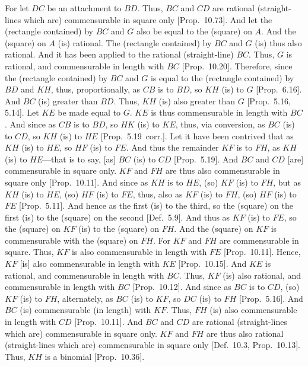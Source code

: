 For let $DC$ be an attachment to $BD$. Thus, $BC$ and $CD$
are rational (straight-lines which are) commensurable in square only [Prop.~10.73]. And let the (rectangle contained)
by $BC$ and $G$ also be equal to the (square) on $A$. And the (square)
on $A$ (is) rational. The (rectangle contained) by $BC$ and $G$ (is) thus also rational. And it has been applied to the rational (straight-line) $BC$.
Thus, $G$ is rational, and commensurable in length with $BC$ [Prop.~10.20]. Therefore, since the (rectangle contained) by $BC$ and $G$ is equal to the (rectangle contained) by
$BD$ and $KH$, thus, proportionally, as $CB$ is to $BD$, so $KH$ (is) to
$G$ [Prop.~6.16]. And $BC$ (is) greater than $BD$.
Thus, $KH$ (is) also greater than $G$ [Prop.~5.16,
5.14]. Let $KE$ be made equal to $G$.
$KE$ is thus commensurable in length with $BC$. And since as
$CB$ is to $BD$, so $HK$ (is) to $KE$, thus, via conversion, as
$BC$ (is) to $CD$, so $KH$ (is) to $HE$ [Prop.~5.19~corr.]. 
Let it have been contrived that as
$KH$ (is) to $HE$, so $HF$ (is) to $FE$. And thus the remainder $KF$ is to
$FH$, as $KH$ (is) to $HE$---that is to say, [as] $BC$ (is) to $CD$
[Prop.~5.19]. And $BC$ and $CD$
[are] commensurable in square only. $KF$ and $FH$ are thus also commensurable in square only [Prop.~10.11].
And since as $KH$ is to $HE$, (so) $KF$ (is) to $FH$, but as $KH$
(is) to $HE$, (so) $HF$ (is) to $FE$, thus, also as $KF$ (is) to $FH$, (so)
$HF$ (is) to $FE$ [Prop.~5.11].
And hence as the first (is) to the third,
so the (square) on the first (is) to the (square) on the second [Def.~5.9].  And thus as $KF$ (is) to $FE$, so the (square) on $KF$ (is) to the (square) on $FH$. And the (square) on $KF$
is commensurable with the (square) on $FH$. For $KF$ and $FH$
are commensurable in square. Thus, $KF$ is also commensurable
in length with  $FE$ [Prop.~10.11]. 
 Hence, $KF$ [is] also commensurable in length with $KE$
  [Prop.~10.15]. And $KE$ is rational,
and commensurable in length with $BC$.  Thus, $KF$ (is) also rational,
and commensurable in length with $BC$ [Prop.~10.12].  And since as $BC$ is to
$CD$, (so)
$KF$ (is) to $FH$, alternately, as $BC$ (is) to $KF$, so $DC$
(is) to $FH$ [Prop.~5.16]. And $BC$ (is) commensurable (in length) with $KF$. Thus, $FH$ (is) also commensurable in length with $CD$ [Prop.~10.11]. And
$BC$ and $CD$ are rational (straight-lines which are) commensurable
in square only. $KF$ and $FH$ are thus also rational (straight-lines which
are) commensurable in square only [Def.~10.3, Prop.~10.13]. Thus, $KH$ is a binomial [Prop.~10.36].


